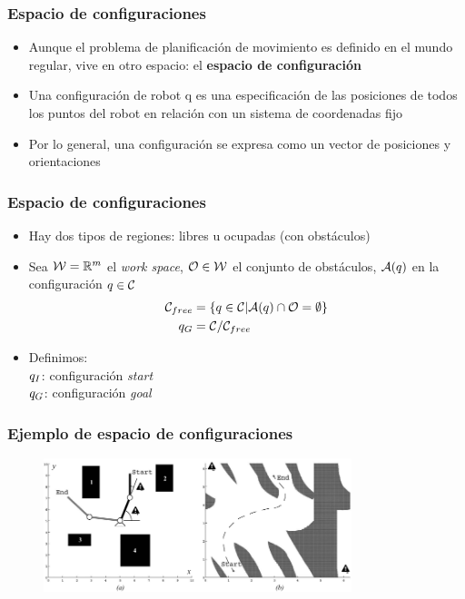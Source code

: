 \begin{frame}
	\frametitle{Espacio de configuraciones}
	
	\begin{itemize}
		\item Aunque el problema de planificación de movimiento es 		definido en el mundo regular, vive en otro espacio: el {\bf espacio de configuración}
		\item Una configuración de robot q es una especificación de las posiciones de todos los puntos del robot en relación con un sistema de coordenadas fijo
		\item Por lo general, una configuración se expresa como un vector de posiciones y orientaciones
	\end{itemize}

	
\end{frame}

\begin{frame}
	\frametitle{Espacio de configuraciones}
	\begin{itemize}
		\item Hay dos tipos de regiones: libres u ocupadas (con obstáculos)
		\item Sea $\mathcal{W} = \mathbb{R}^{m}$ el \emph{work space}, $\mathcal{O} \in \mathcal{W}$ el conjunto de obstáculos, $\mathcal{A}(q)$ en la configuración $q \in \mathcal{C}$
		\begin{align*}
			 \mathcal{C}_{free} &= \left\lbrace q \in \mathcal{C} | \mathcal{A}(q) \cap \mathcal{O} =  \emptyset \right\rbrace\\
			 q_{G} &= \mathcal{C} / \mathcal{C}_{free}
		\end{align*}
	
		\item Definimos:\\
		$q_{I}$: configuración \emph{start}\\
		$q_{G}$: configuración \emph{goal}
		
	
	\end{itemize}
	
\end{frame}

\begin{frame}
	\frametitle{Ejemplo de espacio de configuraciones}
	
	\begin{figure}[!h]
		\includegraphics[width=0.8\textwidth]{images/configuration_space_manipulator.pdf}
	\end{figure}
	
\end{frame}

